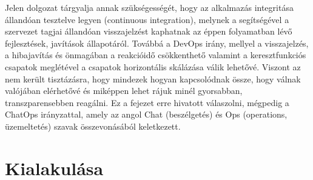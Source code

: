 
Jelen dolgozat tárgyalja annak szükségességét, hogy az alkalmazás integritása állandóan tesztelve legyen (continuous integration), melynek a segítségével a szervezet tagjai állandóan visszajelzést kaphatnak az éppen folyamatban lévő fejlesztések, javítások állapotáról. Továbbá a DevOps irány, mellyel a visszajelzés, a hibajavítás és önmagában a reakcióidő csökkenthető valamint a keresztfunkciós csapatok meglétével a csapatok horizontális skálázása válik lehetővé. Viszont az nem került tisztázásra, hogy mindezek hogyan kapcsolódnak össze, hogy válnak valójában elérhetővé és miképpen lehet rájuk minél gyorsabban, transzparensebben reagálni. Ez a fejezet erre hivatott válaszolni, mégpedig a ChatOps irányzattal, amely az angol Chat (beszélgetés) és Ops (operations, üzemeltetés) szavak összevonásából keletkezett.

\section{Kialakulása}

